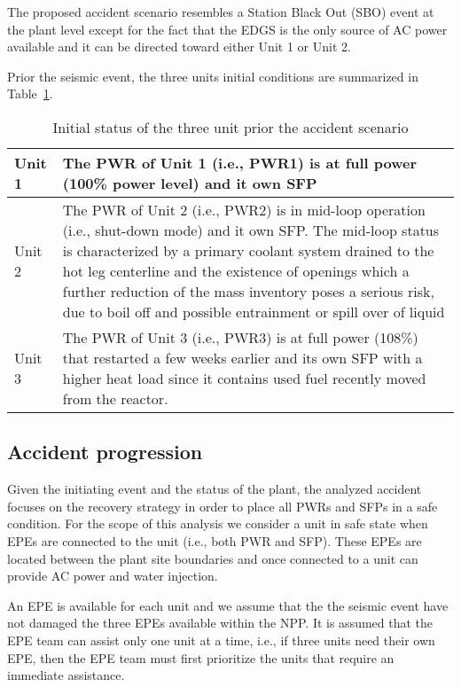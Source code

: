 The proposed accident scenario resembles a Station Black Out (SBO) event at the plant level except for the 
fact that the EDGS is the only source of AC power available and it can be directed toward either Unit 1 or Unit 2.

Prior the seismic event, the three units initial conditions are summarized in Table~\ref{tab:unitsStatus}.

\begin{table}
  \begin{tabular}{ | l | p{10cm} | }
    \hline      
      Unit 1 &  The PWR of Unit 1 (i.e., PWR1) is at full power (100\% power level) and it own SFP \\ \hline
      Unit 2 &  The PWR of Unit 2 (i.e., PWR2) is in mid-loop operation (i.e., shut-down mode) and it own SFP. 
                The mid-loop status is characterized by a primary coolant system drained to the 
                hot leg centerline and the existence of openings which a further reduction of 
                the mass inventory poses a serious risk, due to boil off and possible entrainment 
                or spill over of liquid\\ \hline
      Unit 3 &  The PWR of Unit 3 (i.e., PWR3) is at full power (108\%) that restarted a few weeks 
                earlier and its own SFP with a higher heat load since it contains used fuel recently 
                moved from the reactor. \\
    \hline  
  \end{tabular}
  \caption{Initial status of the three unit prior the accident scenario}
  \label{tab:unitsStatus}
\end{table}

\subsection{Accident progression}
\label{sec:accidentProgression}

Given the initiating event and the status of the plant, the analyzed accident focuses on the recovery strategy 
in order to place all PWRs and SFPs in a safe condition. For the scope of this analysis we consider a unit in
safe state when EPEs are connected to the unit (i.e., both PWR and SFP). These EPEs 
are located between the plant site boundaries and once connected to a unit can provide AC power and water injection.

An EPE is available for each unit and we assume that the the seismic event have not damaged the three EPEs available 
within the NPP. It is assumed that the EPE team can assist only one unit at a time, i.e., if three units need their 
own EPE, then the EPE team must first prioritize the units that require an immediate assistance.
  
